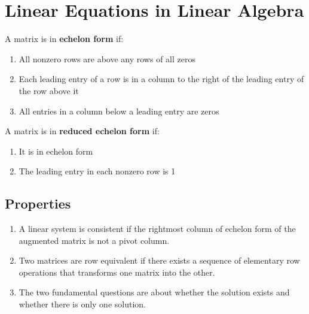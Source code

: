 \documentclass{article}
\begin{document}
\setlength{\parindent}{0pt}

\section*{Linear Equations in Linear Algebra}

A matrix is in \textbf{echelon form} if:
\begin{enumerate}
    \item All nonzero rows are above any rows of all zeros
    \item Each leading entry of a row is in a column to the right of the leading entry of the row
    above it
    \item All entries in a column below a leading entry are zeros
\end{enumerate}

\noindent
A matrix is in \textbf{reduced echelon form} if:
\begin{enumerate}
    \item It is in echelon form
    \item The leading entry in each nonzero row is 1
\end{enumerate}

\subsection*{Properties}
\begin{enumerate}
    \item A linear system is consistent if the rightmost column of echelon form of the augmented matrix is not a pivot column.
    \item Two matrices are row equivalent if there exists a sequence of elementary row operations that transforms one matrix into the other.
    \item The two fundamental questions are about whether the solution exists and whether there is only one solution.
\end{enumerate}
\end{document}
